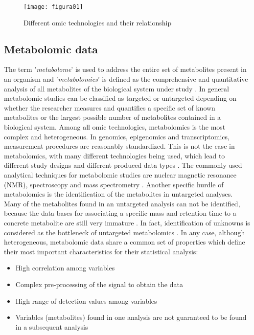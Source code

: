 \begin{figure}[htbp]\centering
		\texttt{[image: figura01]}
		\caption{Different omic technologies and their relationship}
		\label{figura01}
	\end{figure}

\subsection{Metabolomic data}
The term '\textit{metabolome}' is used to address the entire set of metabolites present in an organism and '\textit{metabolomics}' is defined as the comprehensive and quantitative analysis of all metabolites of the biological system under study \parencite{fiehn2001combining}. In general metabolomic studies can be classified as targeted or untargeted depending on whether the researcher measures and quantifies a specific set of known metabolites or the largest possible number of metabolites contained in a biological system. 
Among all omic technologies, metabolomics is the most complex and heterogeneous. In genomics, epigenomics and transcriptomics, measurement procedures are reasonably standardized. This is not the case in metabolomics, with many different technologies being used, which lead to different study designs and different produced data types \parencite{moco2007metabolomics}. The commonly used analytical techniques for metabolomic studies are nuclear magnetic resonance (NMR), spectroscopy and mass spectrometry \parencite{buscher2009cross}. Another specific hurdle of metabolomics is the identification of the metabolites in untargeted analyses. Many of the metabolites found in an untargeted analysis can not be identified, because the data bases for associating a specific mass and retention time to a concrete metabolite are still very immature \parencite{mathew2013metabolomics}. In fact, identification of unknowns is considered as the bottleneck of untargeted metabolomics \parencite{bingol2018recent}.
In any case, although heterogeneous, metabolomic data share a common set of properties which define their most important characteristics for their statistical analysis:

\begin{itemize}
    \item High correlation among variables
    \item Complex pre-processing of the signal to obtain the data
    \item High range of detection values among variables
    \item Variables (metabolites) found in one analysis are not guaranteed to be found in a subsequent analysis
\end{itemize}

